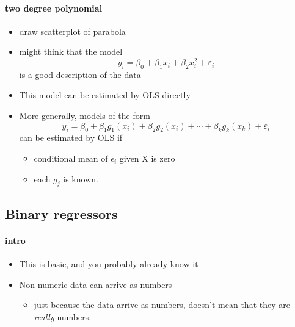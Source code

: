\paragraph{two degree polynomial}
\begin{itemize}
\item draw scatterplot of parabola
\item might think that the model
        \[y_i = \beta_0 + \beta_1 x_i + \beta_2 x_i^2 +
        \varepsilon_i\]
        is a good description of the data
\item This model can be estimated by OLS directly
\item More generally, models of the form
        \[y_i = \beta_0 + \beta_1 g_1(x_i) + \beta_2 g_2(x_i) + \cdots +
        \beta_k g_k(x_k) + \varepsilon_i\]
        can be estimated by OLS if
\begin{itemize}
\item conditional mean of $\epsilon$$_i$ given X is zero
\item each $g_j$ is known.
\end{itemize}
\end{itemize}

\subsection{Binary regressors}

\paragraph{intro}
\begin{itemize}
\item This is basic, and you probably already know it
\item Non-numeric data can arrive as numbers
\begin{itemize}
\item just because the data arrive as numbers, doesn't mean that
          they are \emph{really} numbers.
\end{itemize}
\end{itemize}

